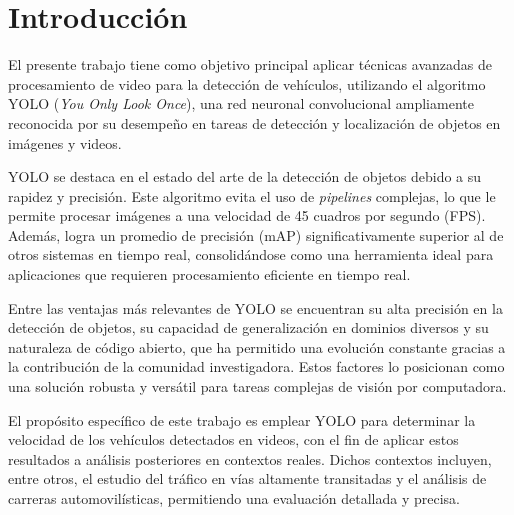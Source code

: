 \section{Introducción}

\noindent
El presente trabajo tiene como objetivo principal aplicar técnicas avanzadas de procesamiento de video para la detección de vehículos, utilizando el algoritmo YOLO (\textit{You Only Look Once}), una red neuronal convolucional ampliamente reconocida por su desempeño en tareas de detección y localización de objetos en imágenes y videos.

\noindent
YOLO se destaca en el estado del arte de la detección de objetos debido a su rapidez y precisión. Este algoritmo evita el uso de \textit{pipelines} complejas, lo que le permite procesar imágenes a una velocidad de 45 cuadros por segundo (FPS). Además, logra un promedio de precisión (mAP) significativamente superior al de otros sistemas en tiempo real, consolidándose como una herramienta ideal para aplicaciones que requieren procesamiento eficiente en tiempo real.

\noindent
Entre las ventajas más relevantes de YOLO se encuentran su alta precisión en la detección de objetos, su capacidad de generalización en dominios diversos y su naturaleza de código abierto, que ha permitido una evolución constante gracias a la contribución de la comunidad investigadora. Estos factores lo posicionan como una solución robusta y versátil para tareas complejas de visión por computadora.

\noindent
El propósito específico de este trabajo es emplear YOLO para determinar la velocidad de los vehículos detectados en videos, con el fin de aplicar estos resultados a análisis posteriores en contextos reales. Dichos contextos incluyen, entre otros, el estudio del tráfico en vías altamente transitadas y el análisis de carreras automovilísticas, permitiendo una evaluación detallada y precisa.

